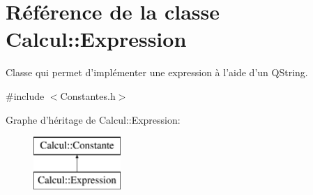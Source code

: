 \hypertarget{class_calcul_1_1_expression}{\section{Référence de la classe Calcul\-:\-:Expression}
\label{class_calcul_1_1_expression}
}


Classe qui permet d'implémenter une expression à l'aide d'un Q\-String.  




{\ttfamily \#include $<$Constantes.\-h$>$}

Graphe d'héritage de Calcul\-:\-:Expression\-:\begin{figure}[H]
\begin{center}
\leavevmode
\includegraphics[height=2.000000cm]{class_calcul_1_1_expression}
\end{center}
\end{figure}
